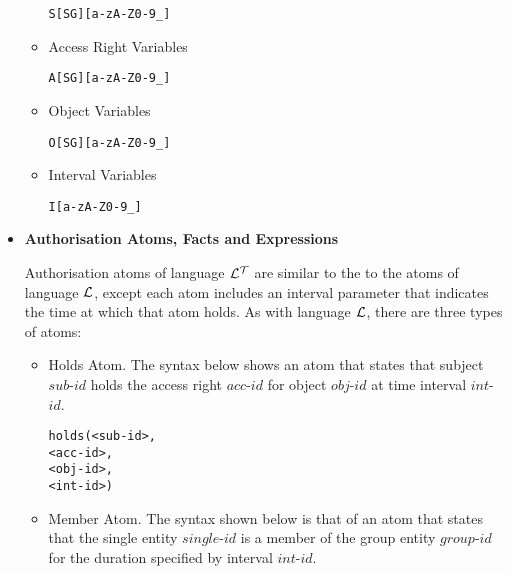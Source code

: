 \documentclass[11pt]{report}
\newenvironment{vverbatim}
{
  \begin{alltt}
}
{
  \vspace{-\baselineskip}
  \end{alltt}
}
\begin{document}
\begin{itemize}
\begin{itemize}
                  \begin{vverbatim}
  S[SG][a-zA-Z0-9\_]
                  \end{vverbatim}

                \item
                  Access Right Variables

                  \begin{vverbatim}
  A[SG][a-zA-Z0-9\_]
                  \end{vverbatim}

                \item
                  Object Variables

                  \begin{vverbatim}
  O[SG][a-zA-Z0-9\_]
                  \end{vverbatim}

                \item
                  Interval Variables

                  \begin{vverbatim}
  I[a-zA-Z0-9\_]
                  \end{vverbatim}

              \end{itemize}

            \item
              {\bf Authorisation Atoms, Facts and Expressions}

              Authorisation atoms of language ${\cal L^T}$ are similar to the
              to the atoms of language ${\cal L}$, except each atom includes
              an interval parameter that indicates the time at which that atom
              holds. As with language ${\cal L}$, there are three types of
              atoms:

              \begin{itemize}
                \item
                  Holds Atom. The syntax below shows an atom that states that
                  subject $sub$-$id$ holds the access right $acc$-$id$ for
                  object $obj$-$id$ at time interval $int$-$id$.

                  \begin{vverbatim}
  holds(<sub-id>,
        <acc-id>,
        <obj-id>,
        <int-id>)
                  \end{vverbatim}

                \item
                  Member Atom. The syntax shown below is that of an atom that
                  states that the single entity $single$-$id$ is a member of
                  the group entity $group$-$id$ for the duration specified by
                  interval $int$-$id$.


\end{itemize}
\end{itemize}
\end{document}
